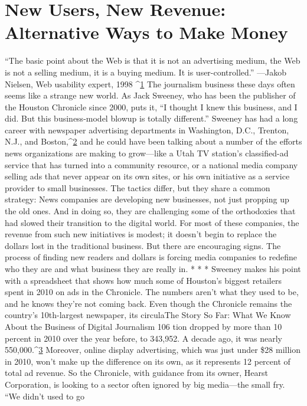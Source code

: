 \chapter{New Users, New Revenue: Alternative Ways to Make Money}
``The basic point about the Web is that it is not an advertising medium, the
Web is not a selling medium, it is a buying medium. It is user-controlled.''
—Jakob Nielsen, Web usability expert, 1998 ^{\href{#endnotes-chapter-8}{1}}
The journalism business these days often seems like a strange new world.
As Jack Sweeney, who has been the publisher of the Houston Chronicle since
2000, puts it, ``I thought I knew this business, and I did. But this business-model
blowup is totally different.'' Sweeney has had a long career with newspaper advertising
departments in Washington, D.C., Trenton, N.J., and Boston,^{\href{#endnotes-chapter-8}{2}} and he
could have been talking about a number of the efforts news organizations are
making to grow—like a Utah TV station's classified-ad service that has turned
into a community resource, or a national media company selling ads that never
appear on its own sites, or his own initiative as a service provider to small businesses.
The tactics differ, but they share a common strategy: News companies
are developing new businesses, not just propping up the old ones. And in doing
so, they are challenging some of the orthodoxies that had slowed their transition
to the digital world.
For most of these companies, the revenue from such new initiatives is modest;
it doesn't begin to replace the dollars lost in the traditional business. But there
are encouraging signs. The process of finding new readers and dollars is forcing
media companies to redefine who they are and what business they are really in.
* * *
Sweeney makes his point with a spreadsheet that shows how much some of
Houston's biggest retailers spent in 2010 on ads in the Chronicle. The numbers
aren't what they used to be, and he knows they're not coming back. Even
though the Chronicle remains the country's 10th-largest newspaper, its circulaThe
Story So Far: What We Know About the Business of Digital Journalism
106
tion dropped by more than 10 percent in 2010 over the year before, to 343,952.
A decade ago, it was nearly 550,000.^{\href{#endnotes-chapter-8}{3}} Moreover, online display advertising, which
was just under \$28 million in 2010, won't make up the difference on its own, as
it represents 12 percent of total ad revenue.
So the Chronicle, with guidance from its owner, Hearst Corporation, is looking
to a sector often ignored by big media—the small fry. ``We didn't used to go
